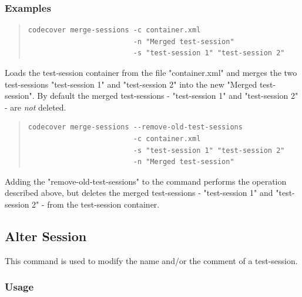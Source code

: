 \subsubsection{Examples}\label{command:ms:examples}
\begin{quote}
\begin{verbatim}
codecover merge-sessions -c container.xml 
                         -n "Merged test-session" 
                         -s "test-session 1" "test-session 2" 
\end{verbatim}
\end{quote}
Loads the test-session container from the file "container.xml" and merges the two test-sessions "test-session 1" and "test-session 2" into the new "Merged test-session". By default the merged test-sessions - "test-session 1" and "test-session 2" - are \emph{not} deleted.
\begin{quote}
\begin{verbatim}
codecover merge-sessions --remove-old-test-sessions 
                         -c container.xml 
                         -s "test-session 1" "test-session 2"
                         -n "Merged test-session" 
\end{verbatim}
\end{quote}
Adding the "remove-old-test-sessions" to the command performs the operation described above, but deletes the merged test-sessions - "test-session 1" and "test-session 2" - from the test-session container.
\subsection{Alter Session}\label{Command-Alter-Session}
This command is used to modify the name and/or the comment of a test-session.
\subsubsection{Usage}\label{command:as:usage}
\begin{quote}
\end{quote}


